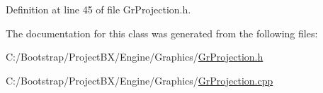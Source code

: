 Definition at line 45 of file GrProjection.h.

The documentation for this class was generated from the following files:\begin{CompactItemize}
\item 
C:/Bootstrap/ProjectBX/Engine/Graphics/\hyperlink{_gr_projection_8h}{GrProjection.h}\item 
C:/Bootstrap/ProjectBX/Engine/Graphics/\hyperlink{_gr_projection_8cpp}{GrProjection.cpp}\end{CompactItemize}
